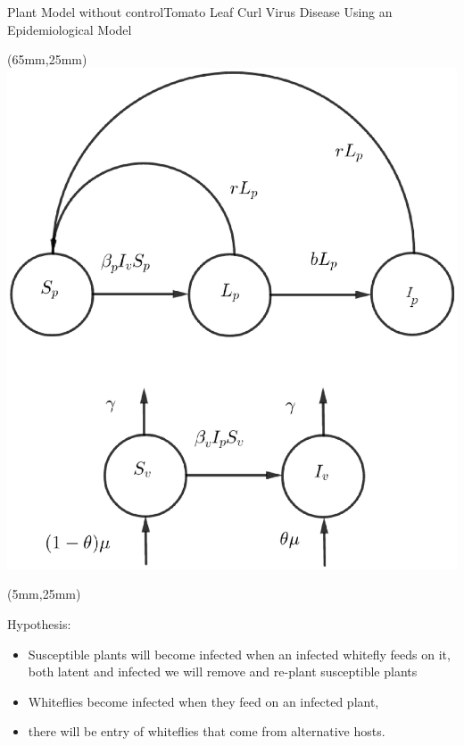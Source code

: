 \documentclass[10pt]{beamer}
\begin{document}
\begin{frame}{Plant Model without control}{Tomato Leaf Curl Virus Disease Using an Epidemiological Model}
\begin{textblock*}{60mm}(65mm,25mm)
    \includegraphics[width=\linewidth]{Feathergraphics/plant_diagram.eps}
\end{textblock*}
\begin{textblock*}{60mm}(5mm,25mm)
	\begin{graybox}{Hypothesis:}
		
		\begin{itemize}
			\item Susceptible plants will become infected when an infected whitefly feeds on it, both latent and infected we will remove and re-plant susceptible plants
			\item Whiteflies become infected when they feed on an infected plant,
			\item there will be entry of whiteflies that come from alternative hosts.
		\end{itemize}
		\end{graybox}	
\end{textblock*}
\end{frame}
\end{document}
